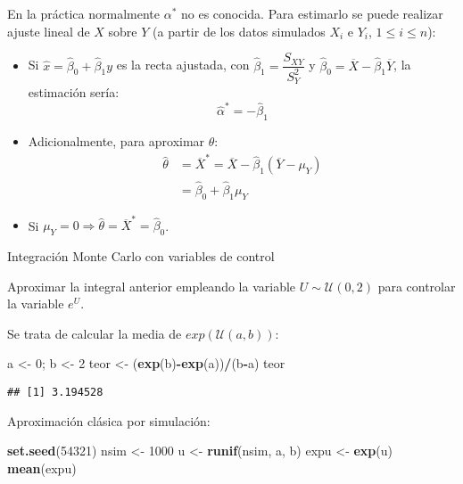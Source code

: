\documentclass[
]{book}
\newenvironment{Shaded}{\begin{snugshade}}{\end{snugshade}}
\newcommand{\DecValTok}[1]{\textcolor[rgb]{0.00,0.00,0.81}{#1}}
\newcommand{\KeywordTok}[1]{\textcolor[rgb]{0.13,0.29,0.53}{\textbf{#1}}}
\newcommand{\NormalTok}[1]{#1}
\newcommand{\OperatorTok}[1]{\textcolor[rgb]{0.81,0.36,0.00}{\textbf{#1}}}
\newcommand{\StringTok}[1]{\textcolor[rgb]{0.31,0.60,0.02}{#1}}
\theoremstyle{break}
\theoremstyle{definition}
\theoremstyle{definition}
\theoremstyle{definition}
\theoremstyle{remark}
\let\BeginKnitrBlock\begin \let\EndKnitrBlock\end
\begin{document}
En la práctica normalmente \(\alpha^{\ast}\) no es conocida.
Para estimarlo se puede realizar ajuste lineal de \(X\) sobre \(Y\)
(a partir de los datos simulados \(X_{i}\) e \(Y_{i}\), \(1\leq i\leq n\)):

\begin{itemize}
\item
  Si \(\hat{x}=\hat{\beta}_{0}+\hat{\beta}_{1}y\) es la recta ajustada, con
  \(\hat{\beta}_{1} = \dfrac{S_{XY}}{S_{Y}^{2}}\) y
  \(\hat{\beta}_{0} = \overline{X}-\hat{\beta}_{1}\overline{Y}\),
  la estimación sería:
  \[\hat{\alpha}^{\ast}=-\hat{\beta}_{1}\]
\item
  Adicionalmente, para aproximar \(\theta\):
  \[\begin{aligned}
  \hat{\theta} & =\overline{X}^{\ast}=\overline{X}-\hat{\beta}_{1}\left( \overline{Y}-\mu_{Y}\right) \\  
  & =\hat{\beta}_{0}+\hat{\beta}_{1}\mu_{Y}
  \end{aligned}\]
\item
  Si \(\mu_{Y}=0\Rightarrow \hat{\theta}=\overline{X}^{\ast}=\hat{\beta}_{0}\).
\end{itemize}

\BeginKnitrBlock{exercise}
\protect\hypertarget{exr:unnamed-chunk-14}{}{\label{exr:unnamed-chunk-14} }Integración Monte Carlo con variables de control
\EndKnitrBlock{exercise}

Aproximar la integral anterior empleando la variable
\(U\sim\mathcal{U}(0,2)\) para controlar la variable \(e^{U}\).

Se trata de calcular la media de \(exp(\mathcal{U}(a,b))\):

\begin{Shaded}
\begin{Highlighting}[]
\NormalTok{a <-}\StringTok{ }\DecValTok{0}\NormalTok{; b <-}\StringTok{ }\DecValTok{2}
\NormalTok{teor <-}\StringTok{ }\NormalTok{(}\KeywordTok{exp}\NormalTok{(b)}\OperatorTok{-}\KeywordTok{exp}\NormalTok{(a))}\OperatorTok{/}\NormalTok{(b}\OperatorTok{-}\NormalTok{a)}
\NormalTok{teor}
\end{Highlighting}
\end{Shaded}

\begin{verbatim}
## [1] 3.194528
\end{verbatim}

Aproximación clásica por simulación:

\begin{Shaded}
\begin{Highlighting}[]
\KeywordTok{set.seed}\NormalTok{(}\DecValTok{54321}\NormalTok{)}
\NormalTok{nsim <-}\StringTok{ }\DecValTok{1000}
\NormalTok{u <-}\StringTok{ }\KeywordTok{runif}\NormalTok{(nsim, a, b)}
\NormalTok{expu <-}\StringTok{ }\KeywordTok{exp}\NormalTok{(u)}
\KeywordTok{mean}\NormalTok{(expu) }
\end{Highlighting}
\end{Shaded}
\end{document}

